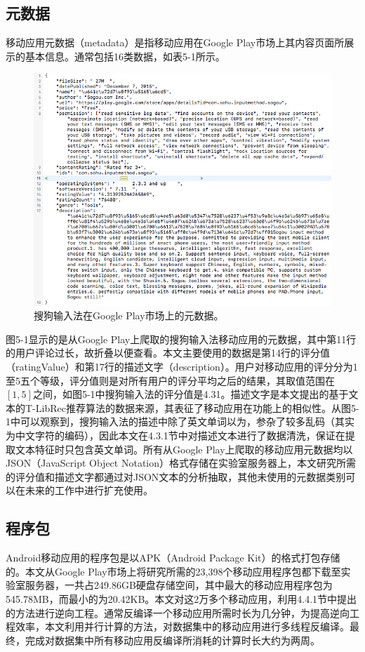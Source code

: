 \subsection{元数据}
移动应用元数据（metadata）是指移动应用在Google Play市场上其内容页面所展示的基本信息。通常包括16类数据，如表5-1所示。

\begin{figure}
	\centering
	\includegraphics[width=5.8in]{figures/metadata}
	\caption{搜狗输入法在Google Play市场上的元数据。}
\end{figure}

图5-1显示的是从Google Play上爬取的搜狗输入法移动应用的元数据，其中第11行的用户评论过长，故折叠以便查看。本文主要使用的数据是第14行的评分值（\textsf{ratingValue}）和第17行的描述文字（\textsf{description}）。用户对移动应用的评分分为1至5五个等级，评分值则是对所有用户的评分平均之后的结果，其取值范围在$[1,5]$之间，如图5-1中搜狗输入法的评分值是4.31。描述文字是本文提出的基于文本的T-LibRec推荐算法的数据来源，其表征了移动应用在功能上的相似性。从图5-1中可以观察到，搜狗输入法的描述中除了英文单词以为，参杂了较多乱码（其实为中文字符的编码），因此本文在4.3.1节中对描述文本进行了数据清洗，保证在提取文本特征时只包含英文单词。所有从Google Play上爬取的移动应用元数据均以JSON（JavaScript Object Notation）格式存储在实验室服务器上，本文研究所需的评分值和描述文字都通过对JSON文本的分析抽取，其他未使用的元数据类别可以在未来的工作中进行扩充使用。


\subsection{程序包}
Android移动应用的程序包是以\textsf{APK}（Android Package Kit）的格式打包存储的。本文从Google Play市场上将研究所需的23,398个移动应用程序包都下载至实验室服务器，一共占249.86GB硬盘存储空间，其中最大的移动应用程序包为545.78MB，而最小的为20.42KB。本文对这2万多个移动应用，利用4.4.1节中提出的方法进行逆向工程。通常反编译一个移动应用所需时长为几分钟，为提高逆向工程效率，本文利用并行计算的方法，对数据集中的移动应用进行多线程反编译。最终，完成对数据集中所有移动应用反编译所消耗的计算时长大约为两周。

